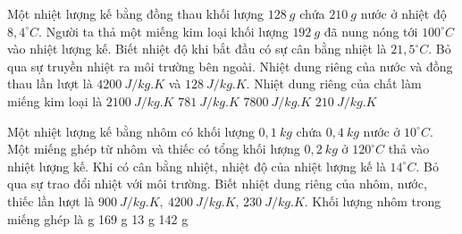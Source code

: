 \begin{vidu}
	Một nhiệt lượng kế bằng đồng thau khối lượng $128\ g$ chứa $210\ g$ nước ở nhiệt độ $8,4^\circ C$. Người ta thả một miếng kim loại khối lượng $192\ g$ đã nung nóng tới $100^\circ C$ vào nhiệt lượng kế. Biết nhiệt độ khi bắt đầu có sự cân bằng nhiệt là $21,5^\circ C$. Bỏ qua sự truyền nhiệt ra môi trường bên ngoài. Nhiệt dung riêng của nước và đồng thau lần lượt là $4200\ J/kg.K$ và $128\ J /kg. K$. Nhiệt dung riêng của chất làm miếng kim loại là
	\choice
	{$2100\ J /kg . K$}
	{\True $781\ J /kg. K$}
	{$7800\ J /kg. K$}
	{$210\ J /kg . K$}
	\end{vidu}
\begin{vidu}%
	Một nhiệt lượng kế bằng nhôm có khối lượng $0,1\ kg$ chứa $0,4\ kg$ nước ở $10^{\circ}C.$ Một miếng ghép từ nhôm và thiếc có tổng khối lượng  $0,2\ kg$ ở $120^\circ C$ thả vào nhiệt lượng kế. Khi có cân bằng nhiệt, nhiệt độ của nhiệt lượng kế là $14^\circ C$. Bỏ qua sự trao đổi nhiệt với môi trường. Biết nhiệt dung riêng của nhôm, nước, thiếc lần lượt là $900\ J/kg.K,\ 4200\ J/kg.K$, $230\ J/kg.K$. Khối lượng nhôm trong miếng ghép là
	\choice
	{ g}
	{169 g}
	{13 g}
	{142 g}
	\end{vidu}

